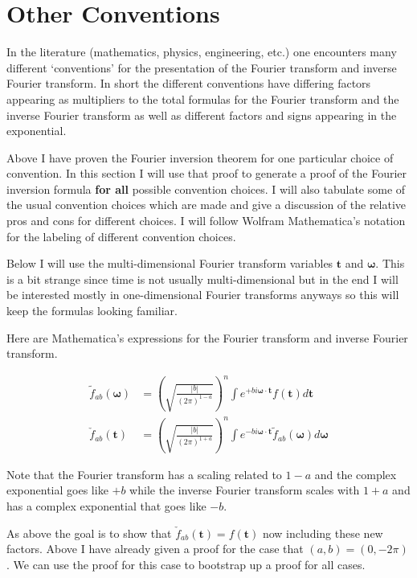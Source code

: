 \documentclass[12pt]{article}
\newcommand{\bv}[1]{\boldsymbol{#1}}
\begin{document}
\section{Other Conventions}

In the literature (mathematics, physics, engineering, etc.) one encounters many different `conventions' for the presentation of the Fourier transform and inverse Fourier transform. In short the different conventions have differing factors appearing as multipliers to the total formulas for the Fourier transform and the inverse Fourier transform as well as different factors and signs appearing in the exponential.

Above I have proven the Fourier inversion theorem for one particular choice of convention. In this section I will use that proof to generate a proof of the Fourier inversion formula \textbf{for all} possible convention choices. I will also tabulate some of the usual convention choices which are made and give a discussion of the relative pros and cons for different choices. I will follow Wolfram Mathematica's notation for the labeling of different convention choices.

Below I will use the multi-dimensional Fourier transform variables $\bv{t}$ and $\bv{\omega}$. This is a bit strange since time is not usually multi-dimensional but in the end I will be interested mostly in one-dimensional Fourier transforms anyways so this will keep the formulas looking familiar.

Here are Mathematica's expressions for the Fourier transform and inverse Fourier transform.

\begin{align}
\tilde{f}_{ab}(\bv{\omega}) &= \left(\sqrt{\frac{|b|}{(2\pi)^{1-a}}}\right)^n\int e^{+bi\bv{\omega} \cdot \bv{t}}f(\bv{t}) d\bv{t}\\
\check{f}_{ab}(\bv{t}) &= \left(\sqrt{\frac{|b|}{(2\pi)^{1+a}}}\right)^n\int e^{-bi \bv{\omega} \cdot \bv{t}}\tilde{f}_{ab}(\bv{\omega}) d\bv{\omega}
\end{align}

Note that the Fourier transform has a scaling related to $1-a$ and the complex exponential goes like $+b$ while the inverse Fourier transform scales with $1+a$ and has a complex exponential that goes like $-b$.

As above the goal is to show that $\check{f}_{ab}(\bv{t}) = f(\bv{t})$ now including these new factors. Above I have already given a proof for the case that $(a,b) = (0, -2\pi)$. We can use the proof for this case to bootstrap up a proof for all cases.
\end{document}
